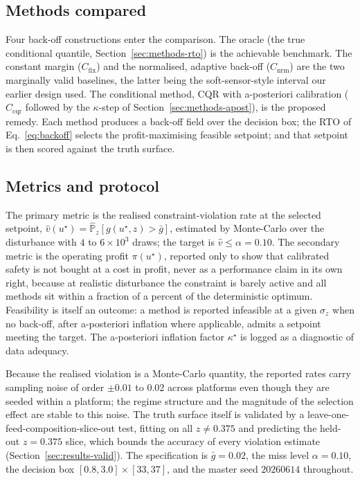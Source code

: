 \documentclass[review,times]{elsarticle}
\begin{document}
\subsection{Methods compared}

Four back-off constructions enter the comparison. The oracle (the true conditional quantile,
Section~\ref{sec:methods-rto}) is the achievable benchmark. The constant margin
($C_{\mathrm{fix}}$) and the normalised, adaptive back-off ($C_{\mathrm{nrm}}$) are the two
marginally valid baselines, the latter being the soft-sensor-style interval our earlier
design used. The conditional method, CQR with a-posteriori calibration ($C_{\mathrm{cqr}}$
followed by the $\kappa$-step of Section~\ref{sec:methods-apost}), is the proposed remedy.
Each method produces a back-off field over the decision box; the RTO of
Eq.~\eqref{eq:backoff} selects the profit-maximising feasible setpoint; and that setpoint is
then scored against the truth surface.

\subsection{Metrics and protocol}

The primary metric is the realised constraint-violation rate at the selected setpoint, $\hat
v(u^\star)=\widehat{\mathbb P}_z[g(u^\star,z)>\bar g]$, estimated by Monte-Carlo over the
disturbance with $4$ to $6\times10^{3}$ draws; the target is $\hat v\le\alpha=0.10$. The
secondary metric is the operating profit $\pi(u^\star)$, reported only to show that calibrated
safety is not bought at a cost in profit, never as a performance claim in its own right,
because at realistic disturbance the constraint is barely active and all methods sit within a
fraction of a percent of the deterministic optimum. Feasibility is itself an outcome: a method
is reported infeasible at a given $\sigma_z$ when no back-off, after a-posteriori inflation
where applicable, admits a setpoint meeting the target. The a-posteriori inflation factor
$\kappa^\star$ is logged as a diagnostic of data adequacy.

Because the realised violation is a Monte-Carlo quantity, the reported rates carry sampling
noise of order $\pm0.01$ to $0.02$ across platforms even though they are seeded within a
platform; the regime structure and the magnitude of the selection effect are stable to this
noise. The truth surface itself is validated by a leave-one-feed-composition-slice-out test,
fitting on all $z\neq0.375$ and predicting the held-out $z=0.375$ slice, which bounds the
accuracy of every violation estimate (Section~\ref{sec:results-valid}). The specification is
$\bar g=0.02$, the miss level $\alpha=0.10$, the decision box $[0.8,3.0]\times[33,37]$, and the
master seed $20260614$ throughout.
\end{document}
